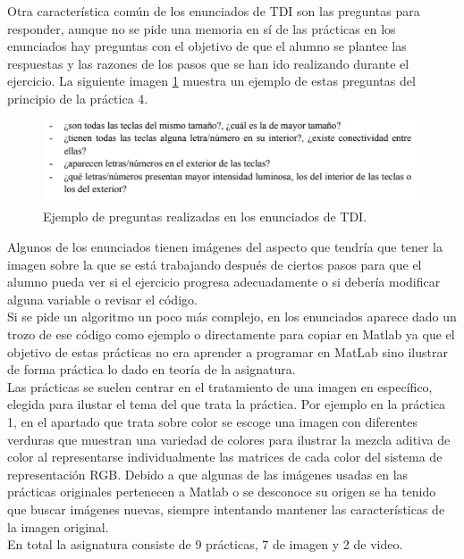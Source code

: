 \documentclass[a4paper,12pt]{report}
\begin{document}
Otra característica común de los enunciados de TDI son las preguntas para responder, aunque no se pide una memoria en sí de las prácticas en los enunciados hay preguntas con el objetivo de que el alumno se plantee las respuestas y las razones de los pasos que se han ido realizando durante el ejercicio.  La siguiente imagen \ref{preguntasp4} muestra un ejemplo de estas preguntas del principio de la práctica 4.

\begin{figure}[h]
\centering
\includegraphics[width=1\textwidth]{imagenes/preguntasp4}
\caption{Ejemplo de preguntas realizadas en los enunciados de TDI.}
\label{preguntasp4}
\end{figure}

Algunos de los enunciados tienen imágenes del aspecto que tendría que tener la imagen sobre la que se está trabajando después de ciertos pasos para que el alumno pueda ver si el ejercicio progresa adecuadamente o si debería modificar alguna variable o revisar el código.\\

Si se pide un algoritmo un poco más complejo, en los enunciados aparece dado un trozo de ese código como ejemplo o directamente para copiar en Matlab ya que el objetivo de estas prácticas no era aprender a programar en MatLab sino ilustrar de forma práctica lo dado en teoría de la asignatura.\\

Las prácticas se suelen centrar en el tratamiento de una imagen en específico, elegida para ilustar el tema del que trata la práctica. Por ejemplo en la práctica 1, en el apartado que trata sobre color se escoge una imagen con diferentes verduras que muestran una variedad de colores para ilustrar la mezcla aditiva de color al representarse individualmente las matrices de cada color del sistema de representación RGB. Debido a que algunas de las imágenes usadas en las prácticas originales pertenecen a Matlab o se desconoce su origen se ha tenido que buscar imágenes nuevas, siempre intentando mantener las características de la imagen original.\\

En total la asignatura consiste de 9 prácticas, 7 de imagen y 2 de video. \\
\end{document}
